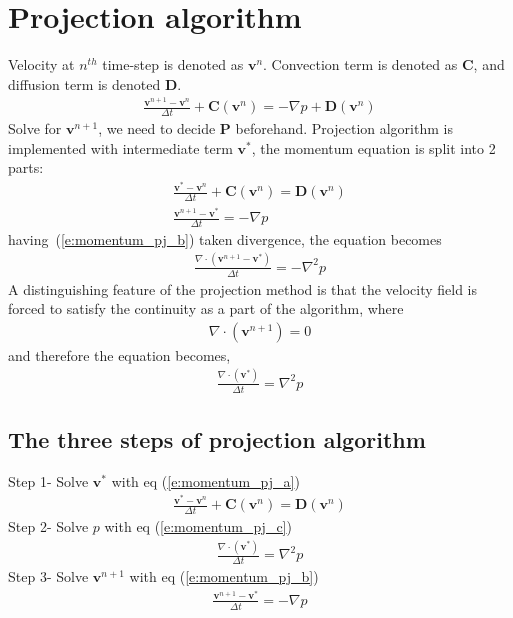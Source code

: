 \documentclass[11pt,dvips]{article}
\numberwithin{equation}{section}
\begin{document}
\section{Projection algorithm \cite{ferziger_cfd_2019}}
Velocity at $n^{th}$ time-step is denoted as $\mathbf{v}^n$. Convection term is 
denoted as $\mathbf{C}$, and diffusion term is denoted $\mathbf{D}$.
%
\begin{align}
\frac{\mathbf{v}^{n+1}-\mathbf{v}^{n}}{\Delta t}+\mathbf{C}(\mathbf{v}^{n})=
-\nabla p+\mathbf{D}(\mathbf{v}^{{n}}) \label{e:momentum_pj} 
\end{align}
%
Solve for $\mathbf{v}^{n+1}$, we need to decide $\mathbf{P}$ beforehand. Projection 
algorithm is implemented with intermediate term $\mathbf{v}^{*}$, the momentum 
equation is split into 2 parts: 
%
\begin{gather}
\frac{\mathbf{v}^{*}-\mathbf{v}^{n}}{\Delta t}+\mathbf{C}(\mathbf{v}^{n})=
\mathbf{D}(\mathbf{v}^{{n}})  \label{e:momentum_pj_a}  \\
\frac{\mathbf{v}^{n+1}-\mathbf{v}^{*}}{\Delta t}=-\nabla p \label{e:momentum_pj_b}
\end{gather}
%
having~(\ref{e:momentum_pj_b}) taken divergence, the equation becomes
%
\begin{align}
\frac{\nabla \cdot(\mathbf{v}^{n+1}-\mathbf{v}^{*})}{\Delta t}=-\nabla ^2 p
\label{e:div_momentum_pj_b}
\end{align}
%
A distinguishing feature of the projection method is that the velocity field is 
forced to satisfy the continuity as a part of the algorithm, where
%
\begin{align}
\nabla \cdot(\mathbf{v}^{n+1})=0 \label{e:continuity_pj}
\end{align}
%
and therefore  the equation becomes, 
%
\begin{align}
\frac{\nabla \cdot(\mathbf{v}^{*})}{\Delta t}=\nabla ^2 p \label{e:momentum_pj_c}
\end{align}
%
\subsection{The three steps of projection algorithm}
Step 1- Solve $\mathbf{v}^{*}$ with eq (\ref{e:momentum_pj_a})
%
\begin{align}
\frac{\mathbf{v}^{*}-\mathbf{v}^{n}}{\Delta t}+\mathbf{C}(\mathbf{v}^{n})=
\mathbf{D}(\mathbf{v}^{{n}})  \nonumber
\end{align}
%
Step 2- Solve $p$ with eq (\ref{e:momentum_pj_c})
%
\begin{align}
\frac{\nabla \cdot(\mathbf{v}^{*})}{\Delta t}=\nabla ^2 p \nonumber
\end{align}
%
Step 3- Solve $\mathbf{v}^{n+1}$  with eq (\ref{e:momentum_pj_b})
%
\begin{align}
\frac{\mathbf{v}^{n+1}-\mathbf{v}^{*}}{\Delta t}=-\nabla p \nonumber
\end{align}
%
\end{document}
